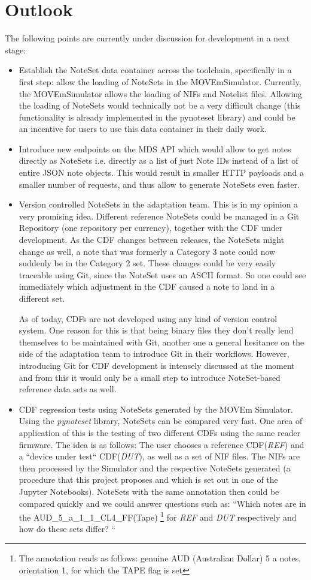 \section{Outlook}
\label{section:outlook}
The following points are currently under discussion for development in a next stage:
\begin{itemize}
	\item Establish the NoteSet data container across the toolchain, specifically in a first step: allow the loading of NoteSets in the MOVEmSimulator. Currently, the MOVEmSimulator allows the loading of NIFs and Notelist files. Allowing the loading of NoteSets would technically not be a very difficult change (this functionality is already implemented in the pynoteset library) and could be an incentive for users to use this data container in their daily work.
	\item Introduce new endpoints on the MDS API which would allow to get notes directly as NoteSets i.e. directly as a list of just Note IDs instead of a list of entire JSON note objects. This would result in smaller HTTP payloads and a smaller number of requests, and thus allow to generate NoteSets even faster.
	\item Version controlled NoteSets in the adaptation team. This is in my opinion a very promising idea. Different reference NoteSets could be managed in a Git Repository (one repository per currency), together with the CDF under development. As the CDF changes between releases, the NoteSets might change as well, a note that was formerly a Category 3 note could now suddenly be in the Category 2 set. These changes could be very easily traceable using Git, since the NoteSet uses an ASCII format. So one could see immediately which adjustment in the CDF caused a note to land in a different set.\par
	As of today, CDFs are not developed using any kind of version control system. One reason for this is that being binary files they don't really lend themselves to be maintained with Git, another one a general hesitance on the side of the adaptation team to introduce Git in their workflows. However, introducing Git for CDF development is intensely discussed at the moment and from this it would only be a small step to introduce NoteSet-based reference data sets as well.
	\item CDF regression tests using NoteSets generated by the MOVEm Simulator. Using the \emph{pynoteset} library, NoteSets can be compared very fast. One area of application of this is the testing of two different CDFs using the same reader firmware. The idea is as follows: The user chooses a reference CDF(\emph{REF}) and a ``device under test`` CDF(\emph{DUT}), as well as a set of NIF files. The NIFs are then processed by the Simulator and the respective NoteSets generated (a procedure that this project proposes and which is set out in one of the Jupyter Notebooks). NoteSets with the same annotation then could be compared quickly and we could answer questions such as: ``Which notes are in the AUD\_5\_a\_1\_1\_CL4\_FF(Tape) \footnote{The annotation reads as follows: genuine AUD (Australian Dollar) 5 a notes, orientation 1, for which the TAPE flag is set} for \emph{REF} and \emph{DUT} respectively and how do these sets differ? ``
\end{itemize}